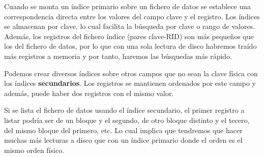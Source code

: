 \documentclass[10pt,a4paper,spanish]{report}
\begin{document}


Cuando se monta un índice primario sobre un fichero de datos se establece una correspondencia directa entre los valores del campo clave y el registro. Los índices se almacenan por clave, lo cual facilita la búsqueda por clave o rango de valores. Además, los registros del fichero índice (pares clave-RID) son más pequeños que los del fichero de datos, por lo que con una sola lectura de disco habremos traído más registros a memoria y por tanto, haremos las búsquedas más rápido.

Podemos crear diversos índices sobre otros campos que no sean la clave física con los índices \textcolor[rgb]{1,0.2,0.3}{\textbf{secundarios}}. Los registros se mantienen ordenados por este campo y además, puede haber dos registros con el mismo valor.



Si se lista el fichero de datos usando el índice secundario, el primer registro a listar podría ser de un bloque y el segundo, de otro bloque distinto y el tecero, del mismo bloque del primero, etc. Lo cual implica que tendremos que hacer muchas más lecturas a disco que con un índice primario donde el orden es el mismo orden físico.
\end{document}
